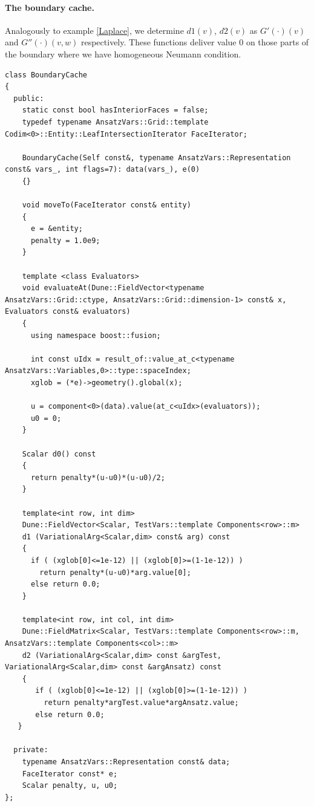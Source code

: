\documentclass[11pt]{article}
\begin{document}


\paragraph{The boundary cache.}
Analogously to example \ref{Laplace}, we determine $d1(v)$, $d2(v)$ as $G'(\cdot)(v)$ and $G''(\cdot)(v,w)$ respectively.
These functions deliver value $0$ on those parts of the boundary where we have homogeneous Neumann condition.

\begin{lstlisting}
class BoundaryCache 
{
  public:
    static const bool hasInteriorFaces = false;
    typedef typename AnsatzVars::Grid::template Codim<0>::Entity::LeafIntersectionIterator FaceIterator;

    BoundaryCache(Self const&, typename AnsatzVars::Representation const& vars_, int flags=7): data(vars_), e(0)
    {}

    void moveTo(FaceIterator const& entity)
    {
      e = &entity;
      penalty = 1.0e9;
    }

    template <class Evaluators>
    void evaluateAt(Dune::FieldVector<typename AnsatzVars::Grid::ctype, AnsatzVars::Grid::dimension-1> const& x, Evaluators const& evaluators) 
    {
      using namespace boost::fusion;

      int const uIdx = result_of::value_at_c<typename AnsatzVars::Variables,0>::type::spaceIndex;
      xglob = (*e)->geometry().global(x);

      u = component<0>(data).value(at_c<uIdx>(evaluators));
      u0 = 0;   
    }

    Scalar d0() const 
    {
      return penalty*(u-u0)*(u-u0)/2;
    }
    
    template<int row, int dim> 
    Dune::FieldVector<Scalar, TestVars::template Components<row>::m>
    d1 (VariationalArg<Scalar,dim> const& arg) const 
    {
      if ( (xglob[0]<=1e-12) || (xglob[0]>=(1-1e-12)) )
        return penalty*(u-u0)*arg.value[0];
      else return 0.0;
    }

    template<int row, int col, int dim> 
    Dune::FieldMatrix<Scalar, TestVars::template Components<row>::m, AnsatzVars::template Components<col>::m>
    d2 (VariationalArg<Scalar,dim> const &argTest, VariationalArg<Scalar,dim> const &argAnsatz) const 
    {
       if ( (xglob[0]<=1e-12) || (xglob[0]>=(1-1e-12)) )
         return penalty*argTest.value*argAnsatz.value;
       else return 0.0;
   }

  private:
    typename AnsatzVars::Representation const& data;
    FaceIterator const* e;
    Scalar penalty, u, u0;
};
\end{lstlisting}
\end{document}
